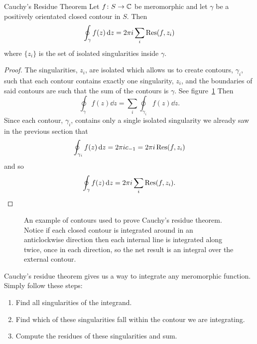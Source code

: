 \documentclass{article}
\begin{document}
    \begin{theorem}{Cauchy's Residue Theorem}{}
        Let \(f\colon S\to\mathbb{C}\) be meromorphic and let \(\gamma\) be a positively orientated closed contour in \(S\).
        Then
        \[\oint_{\gamma} f(z) \dd{z} = 2\pi i \sum_{i} \Res(f, z_i)\]
        where \(\{z_i\}\) is the set of isolated singularities inside \(\gamma\).
    \end{theorem}
    \begin{proof}
        The singularities, \(z_i\), are isolated which allows us to create contours, \(\gamma_i\), such that each contour contains exactly one singularity, \(z_i\), and the boundaries of said contours are such that the sum of the contours is \(\gamma\).
        See figure~\ref{fig:contours for cauchy's residue theorem}
        Then
        \[\oint_{\gamma} f(z)\dd{z} = \sum_{i}\oint_{\gamma_i}f(z)\dd{z}.\]
        Since each contour, \(\gamma_i\), contains only a single isolated singularity we already saw in the previous section that
        \[\oint_{\gamma_i} f(z) \dd{z} = 2\pi ic_{-1} = 2\pi i\Res(f, z_i)\]
        and so
        \[\oint_{\gamma} f(z) \dd{z} = 2\pi i\sum_{i} \Res(f, z_i).\]
    \end{proof}
    \begin{figure}[ht]
        \centering
        \tikzexternalenable
        \tikzexternaldisable
        \caption{An example of contours used to prove Cauchy's residue theorem. Notice if each closed contour is integrated around in an anticlockwise direction then each internal line is integrated along twice, once in each direction, so the net result is an integral over the external contour.}
        \label{fig:contours for cauchy's residue theorem}
    \end{figure}
    Cauchy's residue theorem gives us a way to integrate any meromorphic function.
    Simply follow these steps:
    \begin{enumerate}
        \item Find all singularities of the integrand.
        \item Find which of these singularities fall within the contour we are integrating.
        \item Compute the residues of these singularities and sum.
    \end{enumerate}
    
\end{document}
